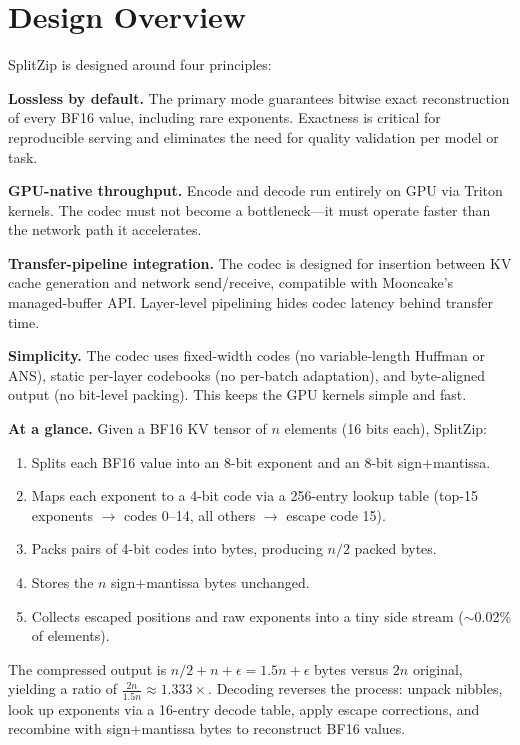 \section{Design Overview}
\label{sec:design}

SplitZip is designed around four principles:

\textbf{Lossless by default.} The primary mode guarantees bitwise exact reconstruction of every BF16 value, including rare exponents. Exactness is critical for reproducible serving and eliminates the need for quality validation per model or task.

\textbf{GPU-native throughput.} Encode and decode run entirely on GPU via Triton kernels. The codec must not become a bottleneck---it must operate faster than the network path it accelerates.

\textbf{Transfer-pipeline integration.} The codec is designed for insertion between KV cache generation and network send/receive, compatible with Mooncake's managed-buffer API. Layer-level pipelining hides codec latency behind transfer time.

\textbf{Simplicity.} The codec uses fixed-width codes (no variable-length Huffman or ANS), static per-layer codebooks (no per-batch adaptation), and byte-aligned output (no bit-level packing). This keeps the GPU kernels simple and fast.

\textbf{At a glance.} Given a BF16 KV tensor of $n$ elements (16 bits each), SplitZip:
\begin{enumerate}[nosep,leftmargin=*]
\item Splits each BF16 value into an 8-bit exponent and an 8-bit sign+mantissa.
\item Maps each exponent to a 4-bit code via a 256-entry lookup table (top-15 exponents $\to$ codes 0--14, all others $\to$ escape code 15).
\item Packs pairs of 4-bit codes into bytes, producing $n/2$ packed bytes.
\item Stores the $n$ sign+mantissa bytes unchanged.
\item Collects escaped positions and raw exponents into a tiny side stream ($\sim$0.02\% of elements).
\end{enumerate}

The compressed output is $n/2 + n + \epsilon = 1.5n + \epsilon$ bytes versus $2n$ original, yielding a ratio of $\frac{2n}{1.5n} \approx 1.333\times$. Decoding reverses the process: unpack nibbles, look up exponents via a 16-entry decode table, apply escape corrections, and recombine with sign+mantissa bytes to reconstruct BF16 values.
